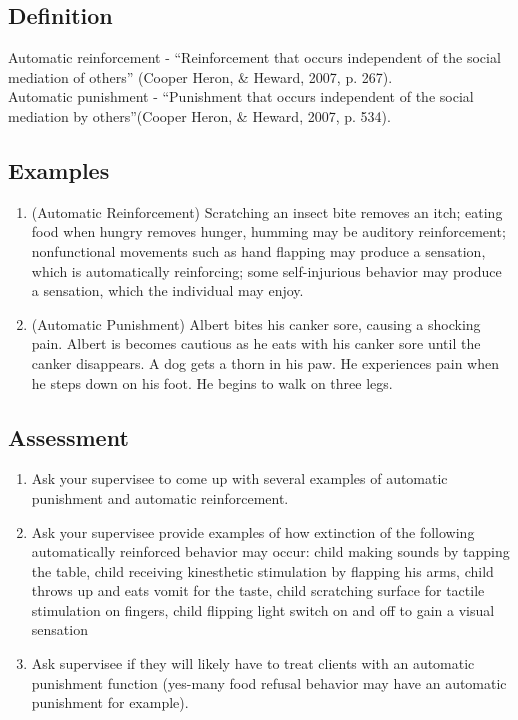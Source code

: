 \subsection{Definition}
Automatic reinforcement - ``Reinforcement that occurs independent of the social mediation of others'' (Cooper Heron, \& Heward, 2007, p. 267).\\

Automatic punishment - ``Punishment that occurs independent of the social mediation by others''(Cooper Heron, \& Heward, 2007, p. 534).
%
\subsection{Examples}  
\begin{enumerate}
\item (Automatic Reinforcement) Scratching an insect bite removes an itch; eating food when hungry removes hunger, humming may be auditory reinforcement; nonfunctional movements such as hand flapping may produce a sensation, which is automatically reinforcing; some self-injurious behavior may produce a sensation, which the individual may enjoy.
\item (Automatic Punishment) Albert bites his canker sore, causing a shocking pain.  Albert is becomes cautious as he eats with his canker sore until the canker disappears.  A dog gets a thorn in his paw.  He experiences pain when he steps down on his foot.  He begins to walk on three legs. 
\end{enumerate}
%
\subsection{Assessment}
\begin{enumerate}
\item Ask your supervisee to come up with several examples of automatic punishment and automatic reinforcement. 
\item Ask your supervisee provide examples of how extinction of the following automatically reinforced behavior may occur: child making sounds by tapping the table, child receiving kinesthetic stimulation by flapping his arms, child throws up and eats vomit for the taste, child scratching surface for tactile stimulation on fingers, child flipping light switch on and off to gain a visual sensation
\item Ask supervisee if they will likely have to treat clients with an automatic punishment function (yes-many food refusal behavior may have an automatic punishment for example).
%
\end{enumerate}
%
